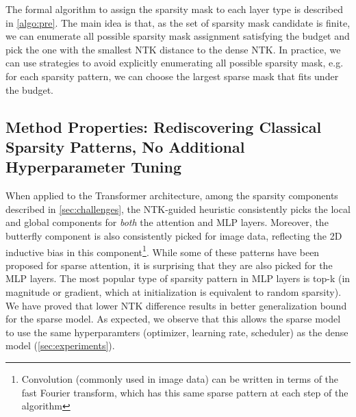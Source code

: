 The formal algorithm to assign the sparsity mask to each layer type is described in \cref{algo:pre}.
The main idea is that, as the set of sparsity mask candidate is finite, we can enumerate all possible sparsity mask assignment satisfying the budget and pick the one with the smallest NTK distance to the dense NTK.
In practice, we can use strategies to avoid explicitly enumerating all possible sparsity mask, e.g. for each sparsity pattern, we can choose the largest sparse mask that fits under the budget.









\subsection{Method Properties: Rediscovering Classical Sparsity Patterns, No Additional Hyperparameter Tuning}
\label{sec:property}
When applied to the Transformer architecture, among the sparsity components described in \cref{sec:challenges}, the NTK-guided heuristic consistently picks the local and global components for \emph{both} the attention and MLP layers.
Moreover, the butterfly component is also consistently picked for image data, reflecting the 2D inductive bias in this component\footnote{Convolution (commonly used in image data) can be written in terms of the fast Fourier transform, which has this same sparse pattern at each step of the algorithm}.
While some of these patterns have been proposed for sparse attention, it is surprising that they are also picked for the MLP layers.
The most popular type of sparsity pattern in MLP layers is top-k (in magnitude or gradient, which at initialization is equivalent to random sparsity).
We have proved that lower NTK difference results in better generalization bound for the sparse model. As expected, we observe that this allows the sparse model to use the same hyperparamters (optimizer, learning rate, scheduler) as the dense model (\cref{sec:experiments}).






